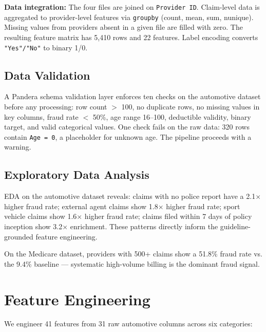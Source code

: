 \documentclass[10pt,twocolumn]{article}
\begin{document}
\textbf{Data integration:} The four files are joined on \texttt{Provider ID}. Claim-level data is aggregated to provider-level features via \texttt{groupby} (count, mean, sum, nunique). Missing values from providers absent in a given file are filled with zero. The resulting feature matrix has 5,410 rows and 22 features. Label encoding converts \texttt{"Yes"/"No"} to binary 1/0.

\subsection{Data Validation}
A Pandera schema validation layer enforces ten checks on the automotive dataset before any processing: row count $>$ 100, no duplicate rows, no missing values in key columns, fraud rate $<$ 50\%, age range 16--100, deductible validity, binary target, and valid categorical values. One check fails on the raw data: 320 rows contain \texttt{Age = 0}, a placeholder for unknown age. The pipeline proceeds with a warning.

\subsection{Exploratory Data Analysis}
EDA on the automotive dataset reveals: claims with no police report have a 2.1$\times$ higher fraud rate; external agent claims show 1.8$\times$ higher fraud rate; sport vehicle claims show 1.6$\times$ higher fraud rate; claims filed within 7 days of policy inception show 3.2$\times$ enrichment. These patterns directly inform the guideline-grounded feature engineering.

On the Medicare dataset, providers with 500+ claims show a 51.8\% fraud rate vs. the 9.4\% baseline --- systematic high-volume billing is the dominant fraud signal.

\section{Feature Engineering}

We engineer 41 features from 31 raw automotive columns across six categories:
\end{document}
